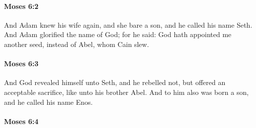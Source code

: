
		\paragraph{Moses 6:2} %
			\label{MOSES-6-2}

			And Adam knew his wife again, and she bare a son, and he called his name Seth. And Adam glorified the name of God; for he said: God hath appointed me another seed, instead of Abel, whom Cain slew.


		\paragraph{Moses 6:3} %
			\label{MOSES-6-3}

			And God revealed himself unto Seth, and he rebelled not, but offered an acceptable sacrifice, like unto his brother Abel. And to him also was born a son, and he called his name Enos.


		\paragraph{Moses 6:4} %
			\label{MOSES-6-4}

